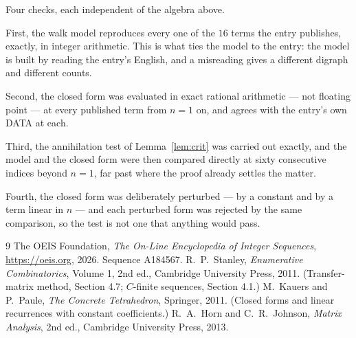\documentclass[11pt,a4paper]{article}
\theoremstyle{plain}
\theoremstyle{definition}
\begin{document}
Four checks, each independent of the algebra above.

First, the walk model reproduces every one of the $16$ terms the entry publishes,
exactly, in integer arithmetic. This is what ties the model to the entry: the model is built
by reading the entry's English, and a misreading gives a different digraph and different
counts.

Second, the closed form was evaluated in exact rational arithmetic --- not floating point ---
at every published term from $n=1$ on, and agrees with the entry's own DATA at each.

Third, the annihilation test of Lemma~\ref{lem:crit} was carried out exactly, and the model
and the closed form were then compared directly at sixty consecutive indices beyond
$n=1$, far past where the proof already settles the matter.

Fourth, the closed form was deliberately perturbed --- by a constant and by a term linear in
$n$ --- and each perturbed form was rejected by the same comparison, so the test is not one
that anything would pass.

\begin{thebibliography}{9}
 The OEIS Foundation, \emph{The On-Line Encyclopedia of Integer
Sequences}, \url{https://oeis.org}, 2026. Sequence A184567.
 R.~P.~Stanley, \emph{Enumerative Combinatorics}, Volume 1, 2nd ed.,
Cambridge University Press, 2011. (Transfer-matrix method, Section 4.7; $C$-finite sequences,
Section 4.1.)
 M.~Kauers and P.~Paule, \emph{The Concrete Tetrahedron}, Springer, 2011.
(Closed forms and linear recurrences with constant coefficients.)
 R.~A.~Horn and C.~R.~Johnson, \emph{Matrix Analysis}, 2nd ed., Cambridge
University Press, 2013.
\end{thebibliography}
\end{document}
